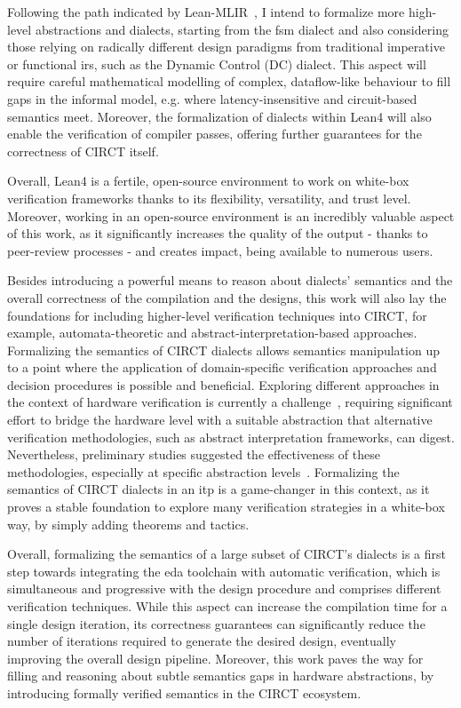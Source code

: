 \documentclass[sigconf,authorversion,nonacm, 11pt]{acmart}
\begin{document}
Following the path indicated by Lean-MLIR~\cite{bhat2024verifying}, I intend to formalize more high-level abstractions and dialects, starting from the \ac{fsm} dialect and also considering those relying on radically different design paradigms from traditional imperative or functional \acp{ir}, such as the Dynamic Control (DC) dialect. 
This aspect will require careful mathematical modelling of complex, dataflow-like behaviour to fill gaps in the informal model, e.g. where latency-insensitive and circuit-based semantics meet. 
Moreover, the formalization of dialects within Lean4 will also enable the verification of compiler passes, offering further guarantees for the correctness of CIRCT itself. 

Overall, Lean4 is a fertile, open-source environment to work on white-box verification frameworks thanks to its flexibility, versatility, and trust level. 
Moreover, working in an open-source environment is an incredibly valuable aspect of this work, as it significantly increases the quality of the output - thanks to peer-review processes - and creates impact, being available to numerous users.  

Besides introducing a powerful means to reason about dialects' semantics and the overall correctness of the compilation and the designs, this work will also lay the foundations for including higher-level verification techniques into CIRCT, for example, automata-theoretic and abstract-interpretation-based approaches. 
Formalizing the semantics of CIRCT dialects allows semantics manipulation up to a point where the application of domain-specific verification approaches and decision procedures is possible and beneficial. 
Exploring different approaches in the context of hardware verification is currently a challenge~\cite{mukherjee2015hardware, malik2008hardware}, requiring significant effort to bridge the hardware level with a suitable abstraction that alternative verification methodologies, such as abstract interpretation frameworks, can digest. 
Nevertheless, preliminary studies suggested the effectiveness of these methodologies, especially at specific abstraction levels~\cite{bernstein2021semantics}. 
Formalizing the semantics of CIRCT dialects in an \ac{itp} is a game-changer in this context, as it proves a stable foundation to explore many verification strategies in a white-box way, by simply adding theorems and tactics.

Overall, formalizing the semantics of a large subset of CIRCT's dialects is a first step towards integrating the \ac{eda} toolchain with automatic verification, which is simultaneous and progressive with the design procedure and comprises different verification techniques. 
While this aspect can increase the compilation time for a single design iteration, its correctness guarantees can significantly reduce the number of iterations required to generate the desired design, eventually improving the overall design pipeline.
Moreover, this work paves the way for filling and reasoning about subtle semantics gaps in hardware abstractions, by introducing formally verified semantics in the CIRCT ecosystem.
\end{document}
